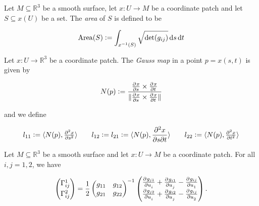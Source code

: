 \vspace{1mm}

\begin{definition}
	Let $M \subseteq \mathbb{R}^3$ be a smooth surface, let $x: U \to M$ be a coordinate patch and let $S \subseteq x(U)$ be a set. The \emph{area} of $S$ is defined to be

	\begin{equation}
		\operatorname{Area}(S) := \int_{x^{-1}(S)} \sqrt{\det(g_{ij})} \mathop{}\!\mathrm{d} s \mathop{}\!\mathrm{d} t
	\end{equation}
\end{definition}

\vspace{1mm}

Let $x: U \to \mathbb{R}^3$ be a coordinate patch. The \emph{Gauss map} in a point $p = x(s,t)$ is given by 

\begin{equation}
	N(p) := \frac{\pd{x}{s} \times \pd{x}{t}}{\norm[0]{\pd{x}{s} \times \pd{x}{t}}} 
\end{equation}

and we define

\begin{equation}
	l_{11} := \langle N(p), \pd[2]{x}{s} \rangle \qquad l_{12} := l_{21} := \langle N(p), \frac{\partial^2 x}{\partial s\partial t}\rangle \qquad 	l_{22} := \langle N(p), \pd[2]{x}{t} \rangle 
\end{equation}

\vspace{1mm}

\begin{lemma}
	Let $M \subseteq \mathbb{R}^3$ be a smooth surface and let $x: U \to M$ be a coordinate patch. For all $i,j = 1,2$, we have 

	\begin{equation}
		\begin{pmatrix}
			\Gamma^1_{ij}\\[3pt]
			\Gamma^2_{ij}
		\end{pmatrix}
		= \frac{1}{2}\begin{pmatrix}
			g_{11} & g_{12}\\
			g_{21} & g_{22}
		\end{pmatrix}^{-1}
		\begin{pmatrix}
			\pd{g_{j1}}{u_i} + \pd{g_{i1}}{u_j} - \pd{g_{ij}}{u_1}\\
			\pd{g_{j2}}{u_i} + \pd{g_{i2}}{u_j} - \pd{g_{ij}}{u_2}
		\end{pmatrix}.
	\end{equation}
\end{lemma}

